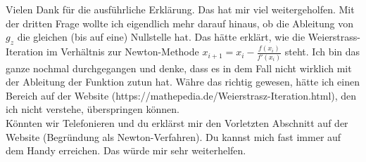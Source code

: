 \documentclass{minimal}
\begin{document}
Vielen Dank für die ausführliche Erklärung. Das hat mir viel weitergeholfen. Mit der dritten Frage wollte ich eigendlich mehr darauf hinaus, ob die Ableitung von $g_z$ die gleichen (bis auf eine) Nullstelle hat. Das hätte erklärt, wie die Weierstrass-Iteration im Verhältnis zur Newton-Methode $x_{i+1}=x_i-\frac{f(x_i)}{f'(x_i)}$ steht. Ich bin das ganze nochmal durchgegangen und denke, dass es in dem Fall nicht wirklich mit der Ableitung der Funktion zutun hat. Währe das richtig gewesen, hätte ich einen Bereich auf der Website (https://mathepedia.de/Weierstrasz-Iteration.html), den ich nicht verstehe, überspringen können. \\
Könnten wir Telefonieren und du erklärst mir den Vorletzten Abschnitt auf der Website (Begründung als Newton-Verfahren). Du kannst mich fast immer auf dem Handy erreichen. Das würde mir sehr weiterhelfen. 
\end{document}
